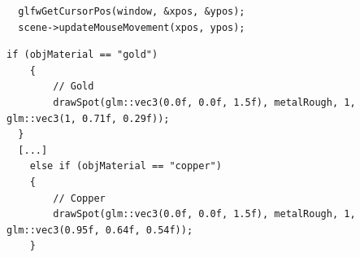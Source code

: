 \documentclass[
  11pt,
  a4paper,
  oneside
  ]{article}
\begin{document}
\begin{lstlisting}
  glfwGetCursorPos(window, &xpos, &ypos);
  scene->updateMouseMovement(xpos, ypos);
\end{lstlisting}
\begin{lstlisting}[tabsize=2]
  if (objMaterial == "gold")
	{
		// Gold
		drawSpot(glm::vec3(0.0f, 0.0f, 1.5f), metalRough, 1, glm::vec3(1, 0.71f, 0.29f));
  }
  [...]  
	else if (objMaterial == "copper")
	{
		// Copper
		drawSpot(glm::vec3(0.0f, 0.0f, 1.5f), metalRough, 1, glm::vec3(0.95f, 0.64f, 0.54f));
	}
\end{lstlisting}





\end{document}

